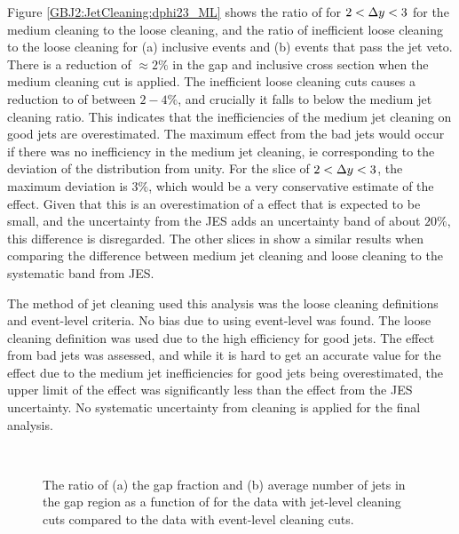Figure \ref{GBJ2:JetCleaning:dphi23_ML} shows the ratio of \dphiDist for $2<\mbox{$\Delta y$}{}<3$ for the medium cleaning to the loose cleaning, and the ratio of inefficient loose cleaning to the loose cleaning for (a) inclusive events and (b) events that pass the jet veto.
There is a reduction of $\approx 2\%$ in the gap and inclusive cross section when the medium cleaning cut is applied.
The inefficient loose cleaning cuts causes a reduction to \dphiDist{} of between $2-4\%$, and crucially it falls to below the medium jet cleaning ratio. 
This indicates that the inefficiencies of the medium jet cleaning on good jets are overestimated.
The maximum effect from the bad jets would occur if there was no inefficiency in the medium jet cleaning, ie corresponding to the deviation of the distribution from unity. 
For the slice of $2<\mbox{$\Delta y$}{}<3$, the maximum deviation is $3\%$, which would be a very conservative estimate of the effect.
Given that this is an overestimation of a effect that is expected to be small, and the uncertainty from the JES adds an uncertainty band of about $20\%$, this difference is disregarded. 
The other slices in \dy{} show a similar results when comparing the difference between medium jet cleaning and loose cleaning to the systematic band from JES.


The method of jet cleaning used this analysis was the loose cleaning definitions and event-level criteria.
No bias due to using event-level was found. 
The loose cleaning definition was used due to the high efficiency for good jets.
The effect from bad jets was assessed, and while it is hard to get an accurate value for the effect due to the medium jet inefficiencies for good jets being overestimated, the upper limit of the effect was significantly less than the effect from the JES uncertainty. 
No systematic uncertainty from cleaning is applied for the final analysis.


\begin{figure}
\centering
\mbox{
              \quad
              \quad
                              }
\caption[Comparison between event and jet level cleaning cuts on the gap fraction and average number of jets]{
The ratio of (a) the gap fraction and (b) average number of jets in the gap region as a function of \dy{} for the data with jet-level cleaning cuts compared to the data with event-level cleaning cuts.
\label{GBJ2:JetCleaning:gap}}
\end{figure}


